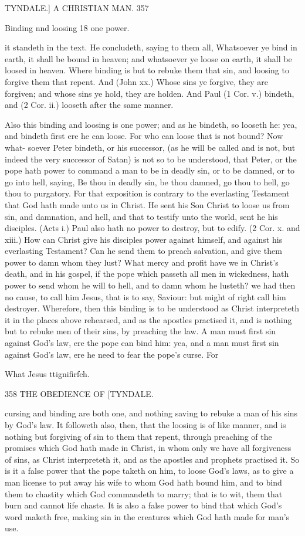 \documentclass{custom}
\begin{document}
{TYNDALE.]
A CHRISTIAN MAN.
357

Binding 
nnd loosing 
18 one 
power. 

it standeth in the text. He concludeth, saying to them all, 
Whatsoever ye bind in earth, it shall be bound in heaven; 
and whatsoever ye loose on earth, it shall be loosed in 
heaven. Where binding is but to rebuke them that sin, 
and loosing to forgive them that repent. And (John xx.) 
Whose sins ye forgive, they are forgiven; and whose sins 
ye hold, they are holden. And Paul (1 Cor. v.) bindeth, 
and (2 Cor. ii.) looseth after the same manner. 

Also this binding and loosing is one power; and as he 
bindeth, so looseth he: yea, and bindeth first ere he can 
loose. For who can loose that is not bound? Now what- 
soever Peter bindeth, or his successor, (as he will be called 
and is not, but indeed the very successor of Satan) is not 
so to be understood, that Peter, or the pope hath power 
to command a man to be in deadly sin, or to be damned, 
or to go into hell, saying, Be thou in deadly sin, be thou 
damned, go thou to hell, go thou to purgatory. For that 
exposition is contrary to the everlasting Testament that 
God hath made unto us in Christ. He sent his Son Christ 
to loose us from sin, and damnation, and hell, and that to 
testify unto the world, sent he his disciples. (Acts i.) Paul 
also hath no power to destroy, but to edify. (2 Cor. x. 
and xiii.) How can Christ give his disciples power against 
himself, and against his everlasting Testament? Can he 
send them to preach salvation, and give them power to 
damn whom they lust? What mercy and profit have we in 
Christ's death, and in his gospel, if the pope which passeth 
all men in wickedness, hath power to send whom he will 
to hell, and to damn whom he lusteth? we had then no 
cause, to call him Jesus, that is to say, Saviour: but 
might of right call him destroyer. Wherefore, then this 
binding is to be understood as Christ interpreteth it in the
places above rehearsed, and as the apostles practised it,
and is nothing but to rebuke men of their sins, by preaching 
the law. A man must first sin against God's law, ere the 
pope can bind him: yea, and a man must first sin against 
God's law, ere he need to fear the pope's curse. For 

What 
Jesus 
ttignifirfch. 


358
THE OBEDIENCE OF
[TYNDALE.

cursing and binding are both one, and nothing saving to 
rebuke a man of his sins by God's law. It followeth 
also, then, that the loosing is of like manner, and is nothing 
but forgiving of sin to them that repent, through preaching 
of the promises which God hath made in Christ, in whom 
only we have all forgiveness of sins, as Christ interpreteth 
it, and as the apostles and prophets practised it. So is it 
a false power that the pope taketh on him, to loose God's 
laws, as to give a man license to put away his wife to 
whom God hath bound him, and to bind them to chastity 
which God commandeth to marry; that is to wit, them 
that burn and cannot life chaste. It is also a false power 
to bind that which God's word maketh free, making sin 
in the creatures which God hath made for man's use. 

}
\end{document}

